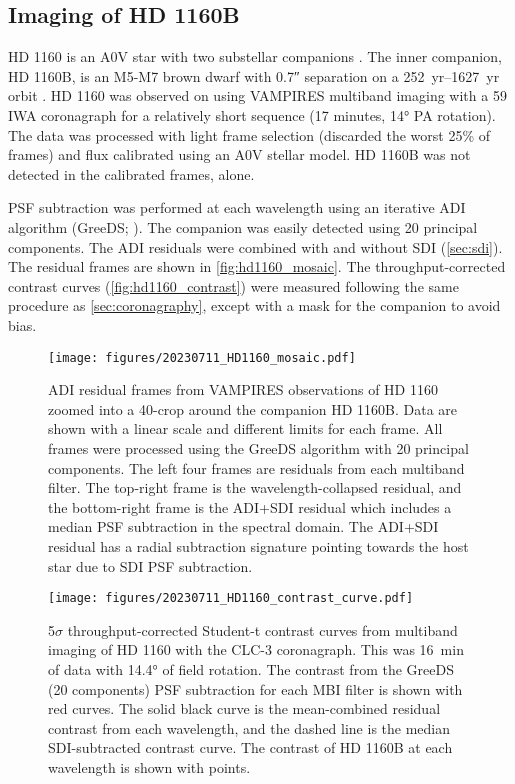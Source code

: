 
\subsection{Imaging of HD 1160B\label{sec:hd1160}}

HD 1160 is an A0V star with two substellar companions \citep{nielsen_gemini_2012,maire_first_2016,garcia_scexao_2017,mesa_characterizing_2020}. The inner companion, HD 1160B, is an M5-M7 brown dwarf with \ang{;;0.7} separation on a \SIrange{252}{1627}{yr} orbit \citep{blunt_orbits_2017}. HD 1160 was observed on  using VAMPIRES multiband imaging with a \SI{59}{\mas} IWA coronagraph for a relatively short sequence (17 minutes, \ang{14} PA rotation). The data was processed with light frame selection (discarded the worst 25\% of frames) and flux calibrated using an A0V stellar model. HD 1160B was not detected in the calibrated frames, alone.

PSF subtraction was performed at each wavelength using an iterative ADI algorithm (GreeDS; \citealt{pairet_reference-less_2019,pairet_mayonnaise_2020,stapper_iterative_2022}). The companion was easily detected using 20 principal components. The ADI residuals were combined with and without SDI (\autoref{sec:sdi}). The residual frames are shown in \autoref{fig:hd1160_mosaic}. The throughput-corrected contrast curves (\autoref{fig:hd1160_contrast}) were measured following the same procedure as \autoref{sec:coronagraphy}, except with a mask for the companion to avoid bias.

\begin{figure*}[t]
    \centering
    \texttt{[image: figures/20230711\_HD1160\_mosaic.pdf]}
    \caption{ADI residual frames from VAMPIRES observations of HD 1160 zoomed into a \SI{40}{\pixel}-crop around the companion HD 1160B. Data are shown with a linear scale and different limits for each frame. All frames were processed using the GreeDS algorithm with 20 principal components. The left four frames are residuals from each multiband filter. The top-right frame is the wavelength-collapsed residual, and the bottom-right frame is the ADI+SDI residual which includes a median PSF subtraction in the spectral domain. The ADI+SDI residual has a radial subtraction signature pointing towards the host star due to SDI PSF subtraction.\label{fig:hd1160_mosaic}}
\end{figure*}

\begin{figure}[h]
    \centering
    \texttt{[image: figures/20230711\_HD1160\_contrast\_curve.pdf]}
    \caption{5$\sigma$ throughput-corrected Student-t contrast curves from multiband imaging of HD 1160 with the CLC-3 coronagraph. This was \SI{16}{\minute} of data with \ang{14.4} of field rotation. The contrast from the GreeDS (20 components) PSF subtraction for each MBI filter is shown with red curves. The solid black curve is the mean-combined residual contrast from each wavelength, and the dashed line is the median SDI-subtracted contrast curve. The contrast of HD 1160B at each wavelength is shown with points.\label{fig:hd1160_contrast}}
\end{figure}

